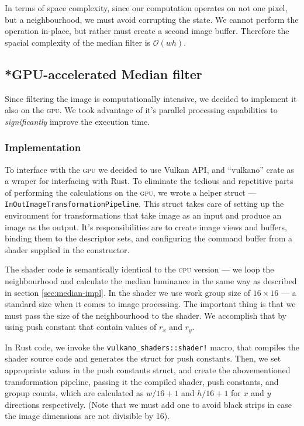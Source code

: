 \documentclass[12pt]{article}
\begin{document}
In terms of space complexity, since our computation operates on not one pixel, but a neighbourhood, we must avoid corrupting the state.
We cannot perform the operation in-place, but rather must create a second image buffer.
Therefore the spacial complexity of the median filter is $\mathcal{O}(wh)$.

\subsection{*GPU-accelerated Median filter}

Since filtering the image is computationally intensive, we decided to implement it also on the \textsc{gpu}.
We took advantage of it's parallel processing capabilities to \emph{significantly} improve the execution time.

\subsubsection{Implementation}\label{sec:median-gpu-impl}

To interface with the \textsc{gpu} we decided to use Vulkan API,
and ``vulkano'' crate as a wraper for interfacing with Rust.
To eliminate the tedious and repetitive parts of performing the calculations on the \textsc{gpu},
we wrote a helper struct --- \lstinline{InOutImageTransformationPipeline}.
This struct takes care of setting up the environment for transformations that take image as an input and produce an image as the output.
It's responsibilities are to create image views and buffers, binding them to the descriptor sets, and configuring the command buffer from a shader supplied in the constructor.

The shader code is semantically identical to the \textsc{cpu} version ---
we loop the neighbourhood and calculate the median luminance in the same way as described in section \ref{sec:median-impl}.
In the shader we use work group size of $16\times16$ --- a standard size when it comes to image processing.
The important thing is that we must pass the size of the neighbourhood to the shader.
We accomplish that by using push constant that contain values of $r_x$ and $r_y$.

In Rust code, we invoke the \lstinline{vulkano_shaders::shader!} macro, that compiles the shader source code and generates the struct for push constants.
Then, we set appropriate values in the push constants struct, and create the abovementioned transformation pipeline,
passing it the compiled shader, push constants, and gropup counts, which are calculated as $w / 16 + 1$ and $h / 16 + 1$ for $x$ and $y$ directions respectively.
(Note that we must add one to avoid black strips in case the image dimensions are not divisible by 16).
\end{document}
